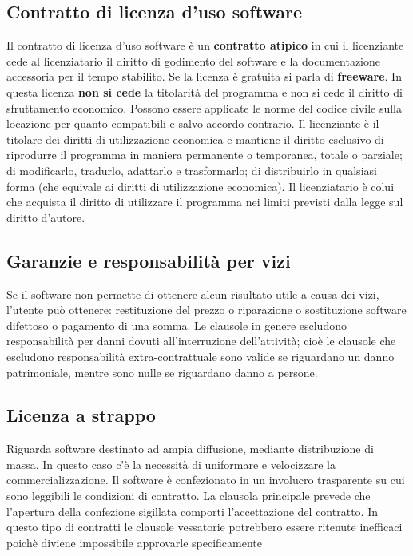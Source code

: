 \subsection{Contratto di licenza d'uso software}
Il contratto di licenza d'uso software è un \textbf{contratto atipico} in cui il licenziante cede al licenziatario il diritto di godimento del software e la
documentazione accessoria per il tempo stabilito. Se la licenza è gratuita si parla di \textbf{freeware}. \newline
In questa licenza \textbf{non si cede} la titolarità del programma e non si cede il diritto di sfruttamento economico.\newline
Possono essere applicate le norme del codice civile sulla locazione per quanto compatibili e salvo accordo contrario.\newline
Il licenziante è il titolare dei diritti di utilizzazione economica e mantiene il diritto esclusivo di riprodurre il
programma in maniera permanente o temporanea, totale o parziale; di modificarlo, tradurlo, adattarlo e trasformarlo; di
distribuirlo in qualsiasi forma (che equivale ai diritti di utilizzazione economica).\newline
Il licenziatario è colui che acquista il diritto di utilizzare il programma nei limiti previsti dalla legge sul
diritto d'autore.

\subsection{Garanzie e responsabilità per vizi}
Se il software non permette di ottenere alcun risultato utile a causa dei vizi, l'utente può ottenere: restituzione del prezzo
o riparazione o sostituzione software difettoso o pagamento di una somma. Le clausole in genere
escludono responsabilità per danni dovuti all'interruzione dell'attività; cioè le clausole che
escludono responsabilità extra-contrattuale sono valide se riguardano un danno patrimoniale, mentre sono
nulle se riguardano danno a persone.

\subsection{Licenza a strappo}
Riguarda software destinato ad ampia diffusione, mediante distribuzione di massa. In questo caso c'è la necessità
di uniformare e velocizzare la commercializzazione.\newline
Il software è confezionato in un involucro trasparente su cui sono leggibili le condizioni di contratto. La clausola
principale prevede che l'apertura della confezione sigillata comporti l'accettazione del contratto.\newline
In questo tipo di contratti le clausole vessatorie potrebbero essere ritenute inefficaci poichè
diviene impossibile approvarle specificamente

